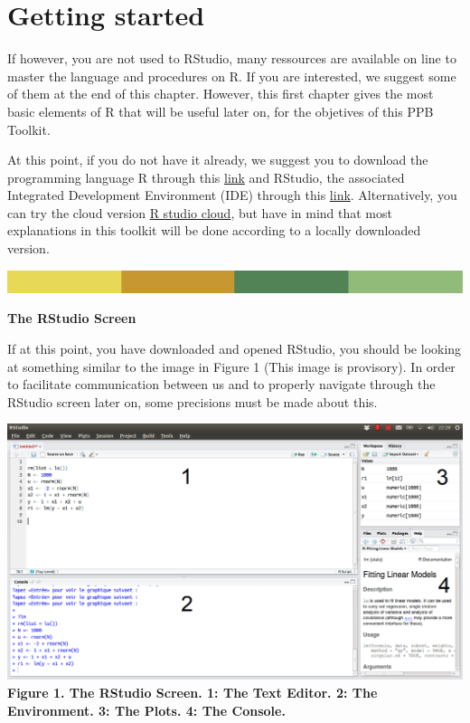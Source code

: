 \documentclass[
]{book}
\begin{document}
\hypertarget{getting-started}{%
\section{Getting started}\label{getting-started}}

If however, you are not used to RStudio, many ressources are available on line to master the language and procedures on R. If you are interested, we suggest some of them at the end of this chapter. However, this first chapter gives the most basic elements of R that will be useful later on, for the objetives of this PPB Toolkit.

At this point, if you do not have it already, we suggest you to download the programming language R through this \href{https://www.r-project.org/}{link} and RStudio, the associated Integrated Development Environment (IDE) through this \href{https://www.rstudio.com/products/rstudio/download/}{link}. Alternatively, you can try the cloud version \href{https://rstudio.cloud/}{R studio cloud}, but have in mind that most explanations in this toolkit will be done according to a locally downloaded version.

\includegraphics{rsrstrip.png}

\textbf{The RStudio Screen}

If at this point, you have downloaded and opened RStudio, you should be looking at something similar to the image in Figure 1 (This image is provisory). In order to facilitate communication between us and to properly navigate through the RStudio screen later on, some precisions must be made about this.

\includegraphics{Rstudio screen 2.png}
\textbf{Figure 1. The RStudio Screen. 1: The Text Editor. 2: The Environment. 3: The Plots. 4: The Console. }
\end{document}
